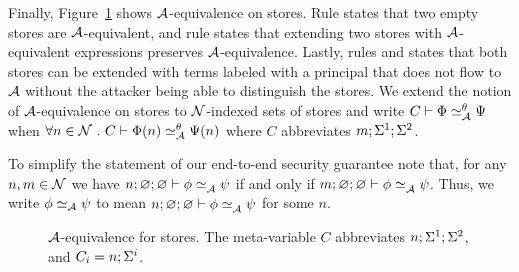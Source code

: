 Finally, Figure~\ref{fig:low-eq-memories} shows $\mathcal{A}$-equivalence on stores. Rule  states that two empty stores are $\mathcal{A}$-equivalent, and rule  states that extending two stores with $\mathcal{A}$-equivalent expressions preserves $\mathcal{A}$-equivalence. Lastly, rules  and  states that both stores can be extended with terms labeled with a principal that does not flow to $\mathcal{A}$ without the attacker being able to distinguish the stores. We extend the notion of $\mathcal{A}$-equivalence on stores to $\mathcal{N}$-indexed sets of stores and write $\loweq{C}{\Attacker}[\bijection]{\globalstore}{\altglobalstore}$ when $\forall n \in \Nameset~.~ \loweq{C}{\Attacker}[\bijection]{\globalstore(n)}{\altglobalstore(n)}$ where $C$ abbreviates $m; \Sigma^1; \Sigma^2$.

To simplify the statement of our end-to-end security guarantee note that, for any $n, m \in \mathcal{N}$ we have $\loweq{n; \emptyenv; \emptyenv}{\Attacker}{\store}{\altstore}$ if and only if $\loweq{m; \emptyenv; \emptyenv}{\Attacker}{\store}{\altstore}$. Thus, we write $\phi \simeq_{\mathcal{A}} \psi$ to mean $\loweq{n; \emptyenv; \emptyenv}{\Attacker}{\store}{\altstore}$ for some $n$.

\begin{figure}
    \centering
    \caption{$\mathcal{A}$-equivalence for stores. The meta-variable $C$ abbreviates $n; \Sigma^1; \Sigma^2$, and $C_i = n; \Sigma^i$.}
    \label{fig:low-eq-memories}
\end{figure}

